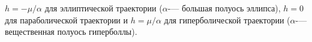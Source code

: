 $h=-\mu/\alpha$ для эллиптической траектории ($\alpha$-— большая полуось эллипса), $h=0$ для параболической траектории и $h=\mu/\alpha$
для гиперболической траектории ($\alpha$-— вещественная полуось гиперболлы).
